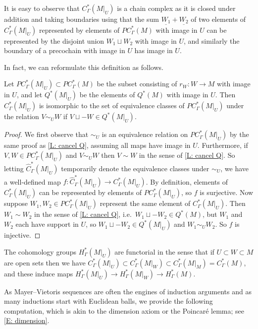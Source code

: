 It is easy to observe that $C_\Gamma^*(M|_U)$ is a chain complex as it is closed under addition and taking boundaries using that the sum $\underline{W_1}+\underline{W_2}$ of two elements of $C^*_\Gamma(M|_U)$ represented by elements of $PC^*_\Gamma(M)$ with image in $U$ can be represented by the disjoint union $W_1 \sqcup W_2$ with image in $U$, and similarly the boundary of a precochain with image in $U$ has image in $U$.

In fact, we can reformulate this definition as follows.

\begin{lemma}
	Let $PC_\Gamma^*(M|_U) \subset PC_\Gamma^*(M)$ be the subset consisting of $r_W \colon W \to M$ with image in $U$, and let $Q^*(M|_U)$ be the elements of $Q^*(M)$ with image in $U$.
	Then $C_\Gamma^*(M|_U)$ is isomorphic to the set of equivalence classes of $PC_\Gamma^*(M|_U)$ under the relation $V\sim_U W$ if $V \sqcup -W \in Q^*(M|_U)$.
\end{lemma}

\begin{proof}
	We first observe that $\sim_U$ is an equivalence relation on $PC_\Gamma^*(M|_U)$ by the same proof as \cref{L: cancel Q}, assuming all maps have image in $U$.
	Furthermore, if $V,W \in PC_\Gamma^*(M|_U)$ and $V\sim_UW$ then $V\sim W$ in the sense of \cref{L: cancel Q}.
	So letting $\hat C_\Gamma^*(M|_U)$ temporarily denote the
	equivalence classes under $\sim_U$, we have a well-defined map $f \colon \hat C_\Gamma^*(M|_U) \to C_\Gamma^*(M|_U)$.
	By definition, elements of $C_\Gamma^*(M|_U)$ can be represented by elements of $PC_\Gamma^*(M|_U)$, so $f$ is surjective.
	Now suppose $W_1,W_2 \in PC^*_\Gamma(M|_U)$ represent the same element of $C^*_\Gamma(M|_U)$.
	Then $W_1\sim W_2$ in the sense of \cref{L: cancel Q}, i.e.\ $W_1 \sqcup -W_2 \in Q^*(M)$, but $W_1$ and $W_2$ each have support in $U$, so $W_1 \sqcup -W_2 \in Q^*(M|_U)$ and $W_1\sim_U W_2$.
	So $f$ is injective.
\end{proof}

The cohomology groups $H_\Gamma^*(M|_U)$ are functorial in the sense that if $U \subset W \subset M$ are open sets then we have $C_\Gamma^*(M|_U) \subset C_\Gamma^*(M|_W) \subset C_\Gamma^*(M|_M) = C_\Gamma^*(M)$, and these induce maps $H_\Gamma^*(M|_U) \to H_\Gamma^*(M|_W) \to H_\Gamma^*(M)$.


As Mayer--Vietoris sequences are often the engines of induction arguments and as many inductions start with Euclidean balls, we provide the following computation, which is akin to the dimension axiom or the Poincar\'e lemma; see \cref{E: dimension}.

